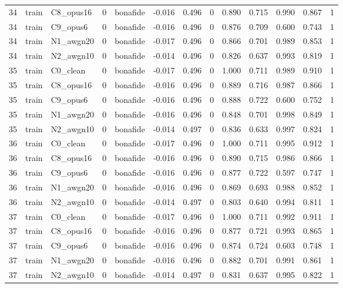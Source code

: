 \begin{tabular}{rllrlrrrrrrrr}
34 & train & C8_opus16 & 0 & bonafide & -0.016 & 0.496 & 0 & 0.890 & 0.715 & 0.990 & 0.867 & 1 \\
34 & train & C9_opus6 & 0 & bonafide & -0.016 & 0.496 & 0 & 0.876 & 0.709 & 0.600 & 0.743 & 1 \\
34 & train & N1_awgn20 & 0 & bonafide & -0.017 & 0.496 & 0 & 0.866 & 0.701 & 0.989 & 0.853 & 1 \\
34 & train & N2_awgn10 & 0 & bonafide & -0.014 & 0.496 & 0 & 0.826 & 0.637 & 0.993 & 0.819 & 1 \\
35 & train & C0_clean & 0 & bonafide & -0.017 & 0.496 & 0 & 1.000 & 0.711 & 0.989 & 0.910 & 1 \\
35 & train & C8_opus16 & 0 & bonafide & -0.016 & 0.496 & 0 & 0.889 & 0.716 & 0.987 & 0.866 & 1 \\
35 & train & C9_opus6 & 0 & bonafide & -0.016 & 0.496 & 0 & 0.888 & 0.722 & 0.600 & 0.752 & 1 \\
35 & train & N1_awgn20 & 0 & bonafide & -0.016 & 0.496 & 0 & 0.848 & 0.701 & 0.998 & 0.849 & 1 \\
35 & train & N2_awgn10 & 0 & bonafide & -0.014 & 0.497 & 0 & 0.836 & 0.633 & 0.997 & 0.824 & 1 \\
36 & train & C0_clean & 0 & bonafide & -0.017 & 0.496 & 0 & 1.000 & 0.711 & 0.995 & 0.912 & 1 \\
36 & train & C8_opus16 & 0 & bonafide & -0.016 & 0.496 & 0 & 0.890 & 0.715 & 0.986 & 0.866 & 1 \\
36 & train & C9_opus6 & 0 & bonafide & -0.016 & 0.496 & 0 & 0.877 & 0.722 & 0.597 & 0.747 & 1 \\
36 & train & N1_awgn20 & 0 & bonafide & -0.016 & 0.496 & 0 & 0.869 & 0.693 & 0.988 & 0.852 & 1 \\
36 & train & N2_awgn10 & 0 & bonafide & -0.014 & 0.497 & 0 & 0.803 & 0.640 & 0.994 & 0.811 & 1 \\
37 & train & C0_clean & 0 & bonafide & -0.017 & 0.496 & 0 & 1.000 & 0.711 & 0.992 & 0.911 & 1 \\
37 & train & C8_opus16 & 0 & bonafide & -0.016 & 0.496 & 0 & 0.877 & 0.721 & 0.993 & 0.865 & 1 \\
37 & train & C9_opus6 & 0 & bonafide & -0.016 & 0.496 & 0 & 0.874 & 0.724 & 0.603 & 0.748 & 1 \\
37 & train & N1_awgn20 & 0 & bonafide & -0.016 & 0.496 & 0 & 0.882 & 0.701 & 0.991 & 0.861 & 1 \\
37 & train & N2_awgn10 & 0 & bonafide & -0.014 & 0.497 & 0 & 0.831 & 0.637 & 0.995 & 0.822 & 1 \\

\end{tabular}
